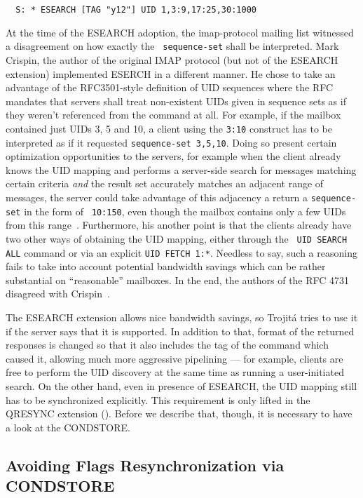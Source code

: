 \documentclass[trojita]{subfiles}
\begin{document}
\begin{verbatim}
  S: * ESEARCH [TAG "y12"] UID 1,3:9,17:25,30:1000
\end{verbatim}

At the time of the ESEARCH adoption, the imap-protocol mailing list witnessed a disagreement on how exactly the {\tt
sequence-set} shall be interpreted.  Mark Crispin, the author of the original IMAP protocol (but not of the ESEARCH
extension) implemented ESERCH in a different manner.  He chose to take an advantage of the RFC3501-style definition of
UID sequences where the RFC mandates that servers shall treat non-existent UIDs given in sequence sets as if they
weren't referenced from the command at all.  For example, if the mailbox contained just UIDs 3, 5 and 10, a client using
the {\tt 3:10} construct has to be interpreted as if it requested {\tt sequence-set 3,5,10}.  Doing so present certain
optimization opportunities to the servers, for example when the client already knows the UID mapping and performs a
server-side search for messages matching certain criteria {\em and} the result set accurately matches an adjacent range
of messages, the server could take advantage of this adjacency a return a {\tt sequence-set} in the form of {\tt
10:150}, even though the mailbox contains only a few UIDs from this range~\cite{crispin-esearch-flawed}.  Furthermore,
his another point is that the clients already have two other ways of obtaining the UID mapping, either through the {\tt
UID SEARCH ALL} command or via an explicit {\tt UID FETCH 1:*}.  Needless to say, such a reasoning fails to take into
account potential bandwidth savings which can be rather substantial on ``reasonable'' mailboxes.  In the end, the
authors of the RFC 4731 disagreed with Crispin~\cite{cridland-esearch-interpretation}.

The ESEARCH extension allows nice bandwidth savings, so Trojitá tries to use it if the server says that it is supported.
In addition to that, format of the returned responses is changed so that it also includes the tag of the command which
caused it, allowing much more aggressive pipelining --- for example, clients are free to perform the UID discovery at the
same time as running a user-initiated search.  On the other hand, even in presence of ESEARCH, the UID mapping still has
to be synchronized explicitly.  This requirement is only lifted in the QRESYNC extension
().  Before we describe that, though, it is necessary to have a look at the CONDSTORE.

\subsection{Avoiding Flags Resynchronization via CONDSTORE}
\end{document}
